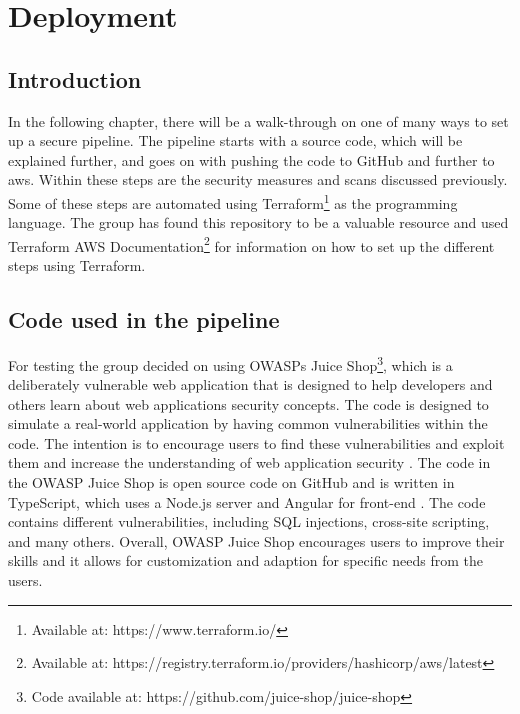 \chapter{Deployment}
\section{Introduction}
In the following chapter, there will be a walk-through on one of many ways to set up a secure pipeline. The pipeline starts with a source code, which will be explained further, and goes on with pushing the code to GitHub and further to \acrshort{aws}. Within these steps are the security measures and scans discussed previously. Some of these steps are automated using Terraform\footnote{Available at: https://www.terraform.io/} as the programming language. The group has found this repository to be a valuable resource \cite{aws-cicd-pipeline} and used Terraform AWS Documentation\footnote{Available at: https://registry.terraform.io/providers/hashicorp/aws/latest} for information on how to set up the different steps using Terraform. 

\section{Code used in the pipeline}
For testing the group decided on using OWASPs Juice Shop\footnote{Code available at: https://github.com/juice-shop/juice-shop}, which is a deliberately vulnerable web application that is designed to help developers and others learn about web applications security concepts. The code is designed to simulate a real-world application by having common vulnerabilities within the code. The intention is to encourage users to find these vulnerabilities and exploit them and increase the understanding of web application security \cite{owaspJuiceShop}.
The code in the OWASP Juice Shop is open source code on GitHub and is written in TypeScript, which uses a Node.js server and Angular for \gls{front-end} \cite{owaspJuiceShopCode}.
The code contains different vulnerabilities, including SQL injections, cross-site scripting, and many others. 
Overall, OWASP Juice Shop encourages users to improve their skills and it allows for customization and adaption for specific needs from the users. 


